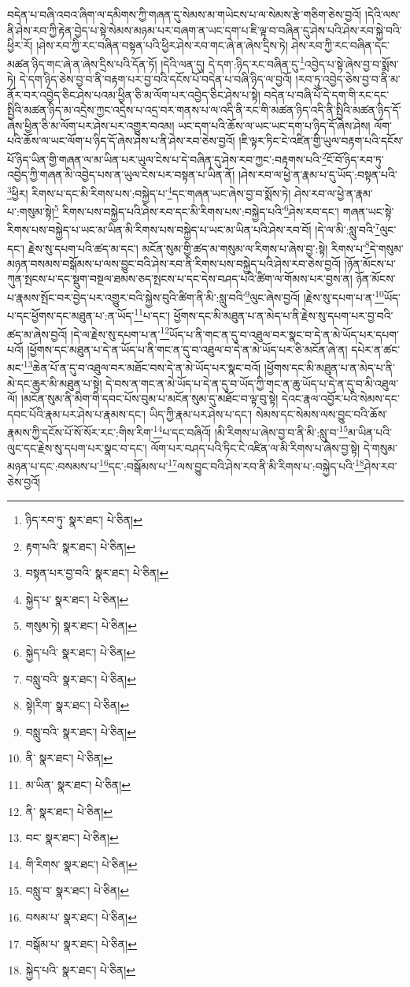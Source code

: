 བདེན་པ་བཞི་འབའ་ཞིག་ལ་དམིགས་ཀྱི་གཞན་དུ་སེམས་མ་གཡེངས་པ་ལ་སེམས་རྩེ་གཅིག་ཅེས་བྱའོ། །དེའི་ལས་ནི་ཤེས་རབ་ཀྱི་རྟེན་བྱེད་པ་སྟེ་སེམས་མཉམ་པར་བཞག་ན་ཡང་དག་པ་ཇི་ལྟ་བ་བཞིན་དུ་ཤེས་པའི་ཤེས་རབ་སྐྱེ་བའི་ཕྱིར་རོ། །ཤེས་རབ་ཀྱི་རང་བཞིན་བསྟན་པའི་ཕྱིར་ཤེས་རབ་གང་ཞེ་ན་ཞེས་དྲིས་ཏེ། ཤེས་རབ་ཀྱི་རང་བཞིན་དང་མཚན་ཉིད་གང་ཞེ་ན་ཞེས་དྲིས་པའི་དོན་ཏོ། །དེའི་ལན་དུ། དེ་དག་:ཉིད་རང་བཞིན་དུ་\footnote{ཉིད་རབ་ཏུ་  སྣར་ཐང་།  པེ་ཅིན། }འབྱེད་པ་སྟེ་ཞེས་བྱ་བ་སྨོས་ཏེ། དེ་དག་ཉིད་ཅེས་བྱ་བ་ནི་བརྟག་པར་བྱ་བའི་དངོས་པོ་བདེན་པ་བཞི་ཉིད་ལ་བྱའོ། །རབ་ཏུ་འབྱེད་ཅེས་བྱ་བ་ནི་མ་ནོར་བར་འབྱེད་ཅིང་ཤེས་པའམ་ཕྱིན་ཅི་མ་ལོག་པར་འབྱེད་ཅིང་ཤེས་པ་སྟེ། བདེན་པ་བཞི་པོ་དེ་དག་གི་རང་དང་སྤྱིའི་མཚན་ཉིད་མ་འདྲེས་ཀྱང་འདྲེས་པ་འདྲ་བར་གནས་པ་ལ་འདི་ནི་རང་གི་མཚན་ཉིད་འདི་ནི་སྤྱིའི་མཚན་ཉིད་དོ་ཞེས་ཕྱིན་ཅི་མ་ལོག་པར་ཤེས་པར་འགྱུར་བའམ། ཡང་དག་པའི་ཆོས་ལ་ཡང་ཡང་དག་པ་ཉིད་དོ་ཞེས་ཤེས། ལོག་པའི་ཆོས་ལ་ཡང་ལོག་པ་ཉིད་དོ་ཞེས་ཤེས་པ་ནི་ཤེས་རབ་ཅེས་བྱའོ། །ཇི་ལྟར་ཏིང་ངེ་འཛིན་གྱི་ཡུལ་བརྟག་པའི་དངོས་པོ་ཉིད་ཡིན་གྱི་གཞན་ལ་མ་ཡིན་པར་ཡུལ་ངེས་པ་དེ་བཞིན་དུ་ཤེས་རབ་ཀྱང་:བརྟགས་པའི་\footnote{རྟག་པའི་  སྣར་ཐང་།  པེ་ཅིན། }ངོ་བོ་ཉིད་རབ་ཏུ་འབྱེད་ཀྱི་གཞན་མི་འབྱེད་པས་ན་ཡུལ་ངེས་པར་བསྟན་པ་ཡིན་ནོ། །ཤེས་རབ་ལ་ཕྱེ་ན་རྣམ་པ་དུ་ཡོད་:བསྟན་པའི་\footnote{བསྟན་པར་བྱ་བའི་  སྣར་ཐང་།  པེ་ཅིན། }ཕྱིར། རིགས་པ་དང་མི་རིགས་པས་:བསྐྱེད་པ་\footnote{སྐྱེད་པ་  སྣར་ཐང་།  པེ་ཅིན། }དང་གཞན་ཡང་ཞེས་བྱ་བ་སྨོས་ཏེ། ཤེས་རབ་ལ་ཕྱེ་ན་རྣམ་པ་:གསུམ་སྟེ།\footnote{གསུམ་ཏེ།  སྣར་ཐང་།  པེ་ཅིན། } རིགས་པས་བསྐྱེད་པའི་ཤེས་རབ་དང་མི་རིགས་པས་:བསྐྱེད་པའི་\footnote{སྐྱེད་པའི་  སྣར་ཐང་།  པེ་ཅིན། }ཤེས་རབ་དང་། གཞན་ཡང་སྟེ་རིགས་པས་བསྐྱེད་པ་ཡང་མ་ཡིན་མི་རིགས་པས་བསྐྱེད་པ་ཡང་མ་ཡིན་པའི་ཤེས་རབ་བོ། །དེ་ལ་མི་:སླུ་བའི་\footnote{བསླུ་བའི་  སྣར་ཐང་།  པེ་ཅིན། }ལུང་དང་། རྗེས་སུ་དཔག་པའི་ཚད་མ་དང་། མངོན་སུམ་གྱི་ཚད་མ་གསུམ་ལ་རིགས་པ་ཞེས་བྱ་:སྟེ། རིགས་པ་\footnote{སྟེ།རིག་  སྣར་ཐང་།  པེ་ཅིན། }དེ་གསུམ་མཉན་བསམས་བསྒོམས་པ་ལས་བྱུང་བའི་ཤེས་རབ་ནི་རིགས་པས་བསྐྱེད་པའི་ཤེས་རབ་ཅེས་བྱའོ། །ཉོན་མོངས་པ་ཀུན་སྤངས་པ་དང་སྡུག་བསྔལ་ཐམས་ཅད་སྤངས་པ་དང་དེས་བཤད་པའི་ཚིག་ལ་གོམས་པར་བྱས་ན། ཉོན་མོངས་པ་རྣམས་སྤོང་བར་བྱེད་པར་འགྱུར་བའི་སྐྱེས་བུའི་ཚིག་ནི་མི་:སླུ་བའི་\footnote{བསླུ་བའི་  སྣར་ཐང་།  པེ་ཅིན། }ལུང་ཞེས་བྱའོ། །རྗེས་སུ་དཔག་པ་ན་\footnote{ནི་  སྣར་ཐང་།  པེ་ཅིན། }ཡོད་པ་དང་ཕྱོགས་དང་མཐུན་པ་:ན་ཡོད་\footnote{མ་ཡིན་  སྣར་ཐང་།  པེ་ཅིན། }པ་དང་། ཕྱོགས་དང་མི་མཐུན་པ་ན་མེད་པ་ནི་རྗེས་སུ་དཔག་པར་བྱ་བའི་ཚད་མ་ཞེས་བྱའོ། །དེ་ལ་རྗེས་སུ་དཔག་པ་ན་\footnote{ནི་  སྣར་ཐང་།  པེ་ཅིན། }ཡོད་པ་ནི་གང་ན་དུ་བ་འཐུལ་བར་སྣང་བ་དེ་ན་མེ་ཡོད་པར་དཔག་པའོ། །ཕྱོགས་དང་མཐུན་པ་དེ་ན་ཡོད་པ་ནི་གང་ན་དུ་བ་འཐུལ་བ་དེ་ན་མེ་ཡོད་པར་ཅི་མངོན་ཞེ་ན། དཔེར་ན་ཚང་མང་\footnote{བང་  སྣར་ཐང་།  པེ་ཅིན། }ཆེན་པོ་ན་དུ་བ་འཐུལ་བར་མཐོང་བས་དེ་ན་མེ་ཡོད་པར་སྣང་བའོ། །ཕྱོགས་དང་མི་མཐུན་པ་ན་མེད་པ་ནི་མེ་དང་ཆུར་མི་མཐུན་པ་སྟེ། དེ་བས་ན་གང་ན་མེ་ཡོད་པ་དེ་ན་དུ་བ་ཡོད་ཀྱི་གང་ན་ཆུ་ཡོད་པ་དེ་ན་དུ་བ་མི་འཐུལ་ལོ། །མངོན་སུམ་ནི་མིག་གི་དབང་པོས་བུམ་པ་མངོན་སུམ་དུ་མཐོང་བ་ལྟ་བུ་སྟེ། དེའང་རྣལ་འབྱོར་པའི་སེམས་དང་དབང་པོའི་རྣམ་པར་ཤེས་པ་རྣམས་དང་། ཡིད་ཀྱི་རྣམ་པར་ཤེས་པ་དང་། སེམས་དང་སེམས་ལས་བྱུང་བའི་ཆོས་རྣམས་ཀྱི་དངོས་པོ་སོ་སོར་རང་:གིས་རིག་\footnote{གི་རིགས་  སྣར་ཐང་།  པེ་ཅིན། }པ་དང་བཞིའོ། །མི་རིགས་པ་ཞེས་བྱ་བ་ནི་མི་:སླུ་བ་\footnote{བསླུ་བ་  སྣར་ཐང་།  པེ་ཅིན། }མ་ཡིན་པའི་ལུང་དང་རྗེས་སུ་དཔག་པར་སྣང་བ་དང་། ལོག་པར་བཤད་པའི་ཏིང་ངེ་འཛིན་ལ་མི་རིགས་པ་ཞེས་བྱ་སྟེ། དེ་གསུམ་མཉན་པ་དང་:བསམས་པ་\footnote{བསམ་པ་  སྣར་ཐང་།  པེ་ཅིན། }དང་:བསྒོམས་པ་\footnote{བསྒོམ་པ་  སྣར་ཐང་།  པེ་ཅིན། }ལས་བྱུང་བའི་ཤེས་རབ་ནི་མི་རིགས་པ་:བསྐྱེད་པའི་\footnote{སྐྱེད་པའི་  སྣར་ཐང་།  པེ་ཅིན། }ཤེས་རབ་ཅེས་བྱའོ། 